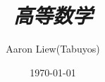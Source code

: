 \documentclass[UTF8,fontset=ubuntu]{ctexart}
\begin{document}
\title{\textit {高等数学}}
\author{Aaron Liew(Tabuyos)}
\date{\today}
\maketitle


\end{document}

